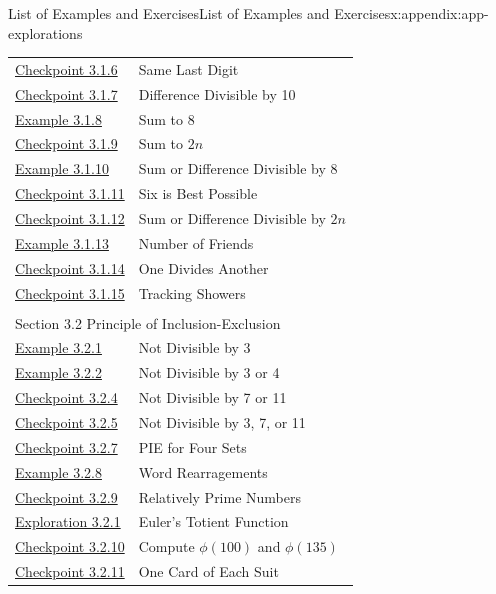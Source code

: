 \documentclass[oneside,10pt,]{book}
\numberwithin{equation}{section}
\begin{document}
\begin{appendixptx}{List of Examples and Exercises}{}{List of Examples and Exercises}{}{}{x:appendix:app-explorations}
\begin{longtable}[l]{ll}
\hyperref[x:exercise:ex-php-last-digit]{Checkpoint 3.1.6}& Same Last Digit\\
\hyperref[x:exercise:ex-php-difference-divisible]{Checkpoint 3.1.7}& Difference Divisible by 10\\
\hyperref[x:example:eg-php-sum-to-8]{Example 3.1.8}& Sum to 8\\
\hyperref[x:exercise:ex-php-sum-to-2n]{Checkpoint 3.1.9}& Sum to \(2n\)\\
\hyperref[x:example:eg-php-sum-diff-8]{Example 3.1.10}& Sum or Difference Divisible by 8\\
\hyperref[x:exercise:ex-php-sum-diff-8-best]{Checkpoint 3.1.11}& Six is Best Possible\\
\hyperref[x:exercise:ex-php-sum-diff-2n]{Checkpoint 3.1.12}& Sum or Difference Divisible by \(2n\)\\
\hyperref[x:example:ex-php-friends]{Example 3.1.13}& Number of Friends\\
\hyperref[x:exercise:ex-php-divides]{Checkpoint 3.1.14}& One Divides Another\\
\hyperref[x:exercise:ex-php-shower]{Checkpoint 3.1.15}& Tracking Showers\\
\multicolumn{2}{l}{\null}\\[1.5ex] \multicolumn{2}{l}{\large Section 3.2 Principle of Inclusion-Exclusion}\\[0.5ex]
\hyperref[x:example:eg-pie-divisible-3]{Example 3.2.1}& Not Divisible by 3\\
\hyperref[x:example:eg-pie-divisible-3-4]{Example 3.2.2}& Not Divisible by 3 or 4\\
\hyperref[x:exercise:ex-pie-divisible-7-11]{Checkpoint 3.2.4}& Not Divisible by 7 or 11\\
\hyperref[x:exercise:ex-pie-divisible-3-7-11]{Checkpoint 3.2.5}& Not Divisible by 3, 7, or 11\\
\hyperref[x:exercise:ex-pie-4sets]{Checkpoint 3.2.7}& PIE for Four Sets\\
\hyperref[x:example:eg-pie-EQUATION]{Example 3.2.8}& Word Rearragements\\
\hyperref[x:exercise:ex-pie-relatively-prime]{Checkpoint 3.2.9}& Relatively Prime Numbers\\
\hyperref[x:exploration:expl-pie-euler-totient]{Exploration 3.2.1}& Euler's Totient Function\\
\hyperref[x:exercise:ex-pie-apply-totient]{Checkpoint 3.2.10}& Compute \(\phi(100)\) and \(\phi(135)\)\\
\hyperref[x:exercise:ex-pie-cards]{Checkpoint 3.2.11}& One Card of Each Suit\\

\end{longtable}
\end{appendixptx}
\end{document}
